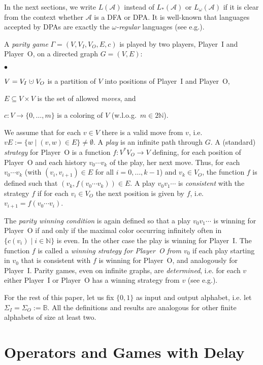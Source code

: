 \documentclass[fleqn,envcountsame]{LMCS}
\newcommand{\dotcup}{\mathrel{\mathaccent\cdot\cup}}
\newcommand{\aut}[1]{\ensuremath{\mathcal{#1}}}
\newcommand{\G}{\ensuremath{\Gamma}\xspace}
\newcommand{\pI}{Player~I\xspace}
\newcommand{\pO}{Player~O\xspace}
\newcommand{\LA}{\ensuremath{L(\aut{A})}\xspace}
\newcommand{\LsA}{\ensuremath{L_*(\aut{A})}\xspace}
\newcommand{\LoA}{\ensuremath{L_{\omega}(\aut{A})}\xspace}
\newcommand{\Nat}{\ensuremath{\mathbb{N}}\xspace}
\newcommand{\B}{\ensuremath{\mathbb{B}}\xspace}
\newcommand{\SI}{\ensuremath{\Sigma_I}\xspace}
\newcommand{\SO}{\ensuremath{\Sigma_O}\xspace}
\newcommand{\ie}{i.e.\xspace}
\newcommand{\eg}{e.g.\xspace}
\begin{document}
In the next sections, we write \LA instead of \LsA or \LoA if it is
clear from the context whether \aut{A} is a DFA or DPA. It is
well-known that languages accepted by DPAs are exactly the
\emph{$\omega$-regular} languages (see \eg \cite{GTW02AutLogInfGam}).

A \emph{parity game} $\G = (V,V_I,V_O,E,c)$ is played by two players,
\pI and \pO, on a directed graph $G = (V, E)$:
\begin{iteMize}{$\bullet$}
\item $V = V_I\dotcup V_O$ is a partition of $V$ into positions of \pI and \pO,
\item $E \subseteq V\times V$ is the set of allowed \emph{moves}, and
\item $c:V\to\{0,\ldots,m\}$ is a coloring of $V$
  (w.l.o.g.\ $m\in2\Nat$).
\end{iteMize}
We assume that for each $v \in V$ there is a valid move from $v$,
\ie $vE:=\{w\mid(v,w)\in E\}\neq\emptyset$.
A \emph{play} is an infinite path through $G$. A (standard) \emph{strategy} for \pO is
a function $f:V^*V_O\to V$ defining, for each position of \pO and each history
$v_0\cdots v_k$ of the play, her next move. Thus, for each $v_0\cdots v_k$
(with $(v_i,v_{i+1})\in E$ for all $i=0,\ldots,k-1$) and $v_k\in V_O$, the
function $f$ is defined such that $(v_k,f(v_0\cdots v_k))\in E$.
A play $v_0v_1\cdots$ is \emph{consistent} with the strategy $f$ if for each
$v_i\in V_O$ the next position is given by $f$, \ie $v_{i+1}=f(v_0\cdots v_i)$.

The \emph{parity winning condition} is again defined so that a play
$v_0v_1\cdots$ is winning for \pO if and only if the maximal color occurring
infinitely often in $\{c(v_i) \mid i \in \Nat\}$ is even.
In the other case the play is winning for \pI.
The function $f$ is called a \emph{winning strategy for \pO from $v_0$}
if each play starting in $v_0$ that is consistent with $f$ is winning for \pO,
and analogously for \pI. Parity games, even on infinite graphs, are
\emph{determined}, \ie for each $v$ either \pI or \pO has a winning strategy
from $v$ (see \eg \cite{GTW02AutLogInfGam}).

For the rest of this paper, let us fix $\{0,1\}$ as input and
output alphabet, \ie let $\SI=\SO:=\B$. All the definitions
and results are analogous for other finite alphabets of size
at least two.



\section{Operators and Games with Delay}\label{sec:operators_games_delay}
\end{document}
